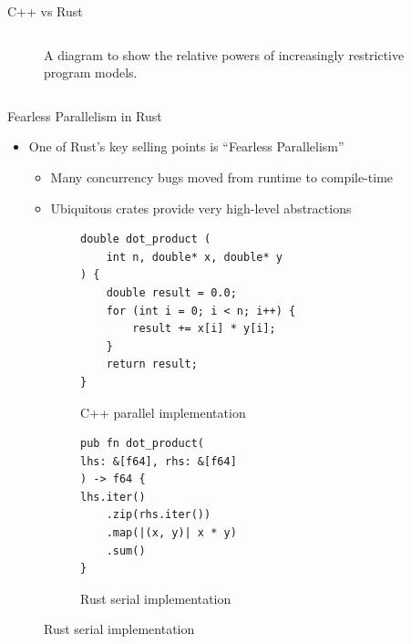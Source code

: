 \documentclass[10pt,aspectratio=169]{beamer}
\begin{document}
\begin{frame}{C++ vs Rust}
\begin{columns}[onlytextwidth]
\begin{figure}[H]
                \caption{A diagram to show the relative powers of increasingly restrictive program models.}
            \label{fig:warwick_mantevo_link}
        \end{figure}
    \end{columns}
%
%
%
\end{frame}

\begin{frame}[fragile]{Fearless Parallelism in Rust}
    \begin{itemize}
        \item One of Rust's key selling points is ``Fearless Parallelism''
        \begin{itemize}
            \item Many concurrency bugs moved from runtime to compile-time
            \item Ubiquitous crates provide very high-level abstractions
        \end{itemize}
    \end{itemize}    
    \vspace*{0.15cm}

    \begin{figure}
        \begin{subfigure}[c]{.55\textwidth}\centering
            \begin{verbatim}
double dot_product (
    int n, double* x, double* y
) {
    double result = 0.0;
    for (int i = 0; i < n; i++) {
        result += x[i] * y[i];
    }
    return result;
}
            \end{verbatim}
            \label{fig:cpp-ddot-serial}
            \caption{C++ parallel implementation}
        \end{subfigure}%
        \begin{subfigure}[c]{.45\textwidth}\centering
            \begin{verbatim}
pub fn dot_product(
lhs: &[f64], rhs: &[f64]
) -> f64 {
lhs.iter()
    .zip(rhs.iter())
    .map(|(x, y)| x * y)
    .sum()
}
            \end{verbatim}
            \label{fig:rust-ddot-serial}
            \vspace*{0.5cm}
            \caption{Rust serial implementation}
        \end{subfigure}
    \end{figure}
\end{frame}
\end{document}
